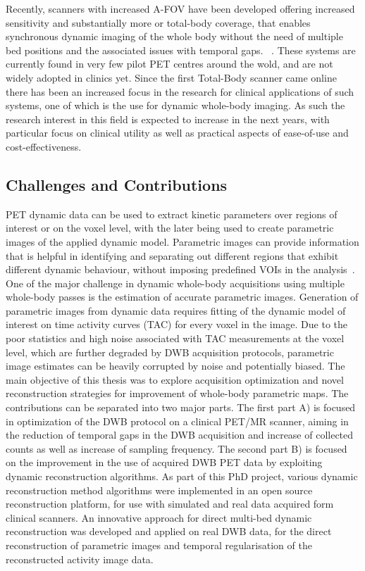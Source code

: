 Recently, scanners with increased A-FOV have been developed offering increased sensitivity and substantially more or total-body coverage, that enables synchronous dynamic imaging of the whole body without the need of multiple bed positions and the associated issues with temporal gaps. ~\cite{Karp2020,Siegel2020, Cherry2018}.
These systems are currently found in very few pilot PET centres around the wold, and are not widely adopted in clinics yet. Since the first Total-Body scanner came online there has been an increased focus in the research for clinical applications of such systems, one of which is the use for dynamic whole-body imaging. As such the research interest in this field is expected to increase in the next years, with particular focus on clinical utility as well as practical aspects of ease-of-use and cost-effectiveness.

\subsection*{Challenges and Contributions}
PET dynamic data can be used to extract kinetic parameters over regions of interest or on the voxel level, with the later being used to create parametric images of the applied dynamic model.
Parametric images can provide information that is helpful in identifying and separating out different regions that exhibit different dynamic behaviour, without imposing predefined VOIs in the analysis~\cite{Gallezot2019}.  
One of the major challenge in dynamic whole-body acquisitions using multiple whole-body passes is the estimation of accurate parametric images. Generation of parametric images from dynamic data requires fitting of the dynamic model of interest on time activity curves (TAC) for every voxel in the image. Due to the poor statistics and high noise associated with TAC measurements at the voxel level, which are further degraded by DWB acquisition protocols, parametric image estimates can be heavily corrupted by noise and potentially biased. 
The main objective of this thesis was to explore acquisition optimization and novel reconstruction strategies for improvement of whole-body parametric maps. 
The contributions can be separated into two major parts. The first part A) is focused in optimization of the DWB protocol on a clinical PET/MR scanner, aiming in the reduction of temporal gaps in the DWB acquisition and increase of collected counts as well as increase of sampling frequency. The second part B) is focused on the improvement in the use of acquired DWB PET data by exploiting dynamic reconstruction algorithms. As part of this PhD project, various dynamic reconstruction method algorithms were implemented in an open source reconstruction platform, for use with simulated and real data acquired form clinical scanners. An innovative approach for direct multi-bed dynamic reconstruction was developed and applied on real DWB data, for the direct reconstruction of parametric images and temporal regularisation of the reconstructed activity image data.

